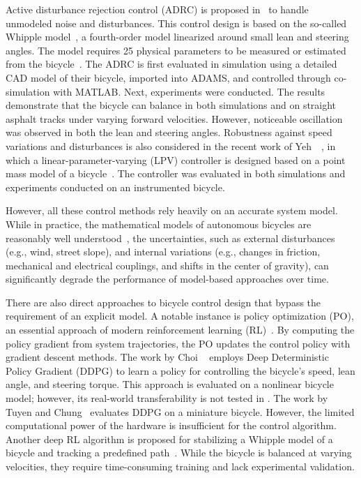 Active disturbance rejection control (ADRC) is proposed in~\cite{Baquero-Suarez2018} to handle unmodeled noise and disturbances. This control design is based on the so-called Whipple model~\cite{Meijaard2007}, a fourth-order model linearized around small lean and steering angles. The model requires 25 physical parameters to be measured or estimated from the bicycle~\cite{kooijman2008}. The ADRC is first evaluated in simulation using a detailed CAD model of their bicycle, imported into ADAMS, and controlled through co-simulation with MATLAB. Next, experiments were conducted. The results demonstrate that the bicycle can balance in both simulations and on straight asphalt tracks under varying forward velocities. However, noticeable oscillation was observed in both the lean and steering angles. Robustness against speed variations and disturbances is also considered in the recent work of Yeh~\etal~\cite{Yeh2024}, in which a linear-parameter-varying (LPV) controller is designed based on a point mass model of a bicycle~\cite{Astrom2005}. The controller was evaluated in both simulations and experiments conducted on an instrumented bicycle. 

However, all these control methods rely heavily on an accurate system model. While in practice, the mathematical models of autonomous bicycles are reasonably well understood~\cite{Meijaard2007, bruni2020state},  the uncertainties, such as external disturbances (e.g., wind, street slope), and internal variations (e.g., changes in friction, mechanical and electrical couplings, and shifts in the center of gravity), can significantly degrade the performance of model-based approaches over time.

There are also direct approaches to bicycle control design that bypass the requirement of an explicit model. A notable instance is policy optimization (PO), an essential approach of modern reinforcement learning (RL)~\cite{choi2019toward, chung2017, weyrer2024path}. By computing the policy gradient from system trajectories, the PO updates the control policy with gradient descent methods. The work by Choi \etal~\cite{choi2019toward} employs Deep Deterministic Policy Gradient (DDPG) to learn a policy for controlling the bicycle's speed, lean angle, and steering torque. This approach is evaluated on a nonlinear bicycle model; however, its real-world transferability is not tested in \cite{choi2019toward}. The work by Tuyen and Chung~\cite{chung2017} evaluates DDPG on a miniature bicycle. However, the limited computational power of the hardware is insufficient for the control algorithm. Another deep RL algorithm is proposed for stabilizing a Whipple model of a bicycle and tracking a predefined path~\cite{weyrer2024path}. While the bicycle is balanced at varying velocities, they require time-consuming training and lack experimental validation. 

